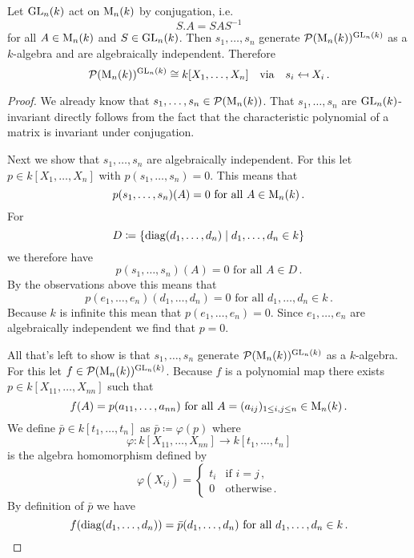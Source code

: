 \begin{theorem}
  Let $\operatorname{GL}_n(k)$ act on $\operatorname{M}_n(k)$ by conjugation, i.e.\
  \[
      S.A
    = SAS^{-1}
  \]
  for all $A \in \operatorname{M}_n(k)$ and $S \in \operatorname{GL}_n(k)$.
  Then $s_1, \dotsc, s_n$ generate $\mathcal{P}(\operatorname{M}_n(k))^{\operatorname{GL}_n(k)}$ as a $k$-algebra and are algebraically independent.
  Therefore
  \[
              \mathcal{P}(\operatorname{M}_n(k))^{\operatorname{GL}_n(k)}
    \cong     k[X_1, \dotsc, X_n]
    \quad\text{via}\quad
              s_i
    \mapsfrom X_i \,.
  \]
\end{theorem}
\begin{proof}
  We already know that $s_1, \dotsc, s_n \in \mathcal{P}(\operatorname{M}_n(k))$.
  That $s_1, \dotsc, s_n$ are $\operatorname{GL}_n(k)$-invariant directly follows from the fact that the characteristic polynomial of a matrix is invariant under conjugation.
  
  Next we show that $s_1, \dotsc, s_n$ are algebraically independent.
  For this let $p \in k[X_1, \dotsc, X_n]$ with $p(s_1, \dotsc, s_n) = 0$.
  This means that
  \[
        p(s_1, \dotsc, s_n)(A)
    =   0
    \text{ for all }
        A
    \in \operatorname{M}_n(k) \,.
  \]
  For
  \[
              D
    \coloneqq \{
                \operatorname{diag}(d_1, \dotsc, d_n)
              \mid
                    d_1, \dotsc, d_n
                \in k
              \}
  \]
  we therefore have
  \[
      p(s_1, \dotsc, s_n)(A)
    = 0
    \text{ for all }
        A
    \in D \,.
  \]
  By the observations above this means that 
  \[
      p(e_1, \dotsc, e_n)(d_1, \dotsc, d_n)
    = 0
    \text{ for all }
        d_1, \dotsc, d_n
    \in k \,.
  \]
  Because $k$ is infinite this mean that $p(e_1, \dotsc, e_n) = 0$.
  Since $e_1, \dotsc, e_n$ are algebraically independent we find that $p =0$.
  
  All that’s left to show is that $s_1, \dotsc, s_n$ generate $\mathcal{P}(\operatorname{M}_n(k))^{\operatorname{GL}_n(k)}$ as a $k$-algebra.
  For this let $f \in \mathcal{P}(\operatorname{M}_n(k))^{\operatorname{GL}_n(k)}$.
  Because $f$ is a polynomial map there exists $p \in k[X_{11}, \dotsc, X_{nn}]$ such that
  \[
      f(A)
    = p(a_{11}, \dotsc, a_{nn})
    \text{ for all }
        A
    =   (a_{ij})_{1 \leq i,j \leq n}
    \in \operatorname{M}_n(k) \,.
  \]
  We define $\bar{p} \in k[t_1, \dotsc, t_n]$ as $\bar{p} \coloneqq \varphi(p)$ where
  \[
            \varphi
    \colon  k[X_{11}, \dotsc, X_{nn}]
    \to     k[t_1, \dotsc, t_n]
  \]
  is the algebra homomorphism defined by
  \[
      \varphi(X_{ij})
    = \begin{cases}
        t_i & \text{if } i = j \,,  \\
          0 & \text{otherwise} \,.
      \end{cases}
  \]
  By definition of $\bar{p}$ we have
  \[
      f(\operatorname{diag}(d_1, \dotsc, d_n))
    = \bar{p}(d_1, \dotsc, d_n)
    \text{ for all }
        d_1, \dotsc, d_n
    \in k \,.
  \]
  

\end{proof}
